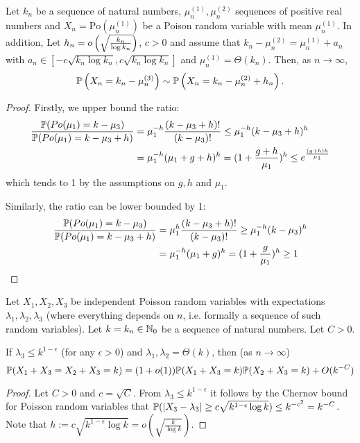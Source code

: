 \begin{appendices}
\begin{lemma}\label{lem:Poissonstab}
Let $k_n$ be a sequence of natural numbers, $\mu_n^{(1)}, \mu_n^{(2)}$ sequences of positive real numbers and $X_n = \mathrm{Po}(\mu_n^{(1)})$ be a Poison random variable with mean $\mu_n^{(1)}$. In addition, Let $h_n = o\left(\sqrt{\frac{k_n}{\log k_n}}\right)$, $c > 0$ and assume that $k_n-\mu_n^{(2)} = \mu_n^{(1)}+a_n$ with $a_n \in [-c\sqrt{k_n\log k_n},c\sqrt{k_n\log k_n}]$ and $\mu_n^{(1)}=\Theta(k_n)$. 
Then, as $n \to \infty$,
\[
	\mathbb{P}\left(X_n = k_n - \mu_n^{(3)}\right) \sim \mathbb{P}\left(X_n = k_n - \mu_n^{(2)} + h_n\right).
\]
\end{lemma}
\begin{proof}
	Firstly, we upper bound the ratio:
	\begin{align*}
	\frac{\mathbb{P}(Po(\mu_1)=k-\mu_3)}{\mathbb{P}(Po(\mu_1)=k-\mu_3 +h)} &= \mu_1^{-h} \frac{(k-\mu_3+h)!}{(k-\mu_3)!}  \leq \mu_1^{-h} (k-\mu_3+h)^h\\
	 &= \mu_1^{-h} (\mu_1+g+h)^h = (1+\frac{g+h}{\mu_1})^h \leq e^{\frac{(g+h)h}{\mu_1}}
	\end{align*}
	which tends to 1 by the assumptions on $g,h$ and $\mu_1$.
	
	Similarly, the ratio can be lower bounded by 1:
	\begin{align*}
	\frac{\mathbb{P}(Po(\mu_1)=k-\mu_3)}{\mathbb{P}(Po(\mu_1)=k-\mu_3 +h)} &= \mu_1^{h} \frac{(k-\mu_3+h)!}{(k-\mu_3)!}  \geq \mu_1^{-h} (k-\mu_3)^h\\
	 &= \mu_1^{-h} (\mu_1+g)^h = (1+\frac{g}{\mu_1})^h \geq 1 
	\end{align*}
\end{proof}

\begin{lemma}\label{lem:joint_distribution_Poisson}
	Let $X_1, X_2, X_3$ be independent Poisson random variables with expectations $\lambda_1, \lambda_2, \lambda_3$ (where everything depends on $n$, i.e. formally a sequence of such random variables). Let $k=k_n \in \mathbb{N}_0$ be a sequence of natural numbers. Let $C>0$.
	
	If $\lambda_3 \leq  k^{1-\epsilon}$ (for any $\epsilon>0$) and $\lambda_1, \lambda_2 = \Theta(k)$, %
	then (as $n \rightarrow \infty$) 
	$$\mathbb{P}(X_1+X_3=X_2+X_3=k) =(1+o(1)) \mathbb{P}(X_1+X_3=k)\mathbb{P}(X_2+X_3=k)+O(k^{-C})$$
\end{lemma}
\begin{proof}
Let $C>0$ and $c = \sqrt{C}$.
From $\lambda_3 \leq k^{1-\epsilon}$ it follows by the Chernov bound for Poisson random variables that $\mathbb{P}(|X_3-\lambda_3| \geq c\sqrt{k^{1-\epsilon} \log k}) \leq k^{-c^2} = k^{-C}$. Note that $h:= c\sqrt{k^{1-\epsilon} \log k} = o(\sqrt{\frac{k}{\log k}})$.


\end{proof}
\end{appendices}
